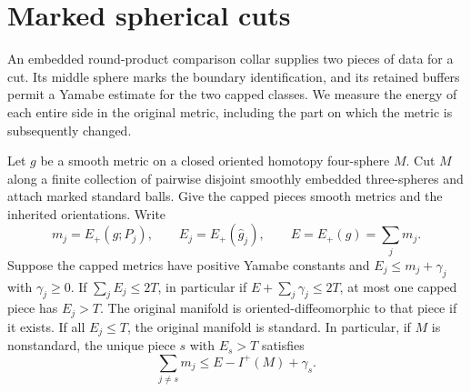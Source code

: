 \section{Marked spherical cuts}\label{sec:cut}

An embedded round-product comparison collar supplies two pieces of data
for a cut. Its middle sphere marks the boundary identification, and its
retained buffers permit a Yamabe estimate for the two capped classes.
We measure the energy of each entire side in the original metric,
including the part on which the metric is subsequently changed.


\begin{proposition}\label{prop:cut-energy}
Let \(g\) be a smooth metric on a closed oriented homotopy four-sphere \(M\). Cut \(M\) along a finite collection of pairwise disjoint smoothly
embedded three-spheres and attach marked standard balls. Give the
capped pieces smooth metrics and the inherited orientations. Write
\[
 m_j=E_+(g;P_j),\qquad E_j=E_+(\widehat g_j),\qquad
 E=E_+(g)=\sum_j m_j .
\]
Suppose the capped metrics have positive Yamabe constants and
\(E_j\leq m_j+\gamma_j\) with \(\gamma_j\geq0\). If
\(\sum_j E_j\leq2T\), in particular if \(E+\sum_j\gamma_j\leq2T\),
at most one capped piece has \(E_j>T\). The original manifold is
oriented-diffeomorphic to that piece if it exists. If all \(E_j\leq T\), the original manifold is
standard. In particular, if \(M\) is nonstandard, the unique piece
\(s\) with \(E_s>T\) satisfies
\begin{equation}\label{eq:cut-discarded}
 \sum_{j\ne s}m_j\leq E-I^+(M)+\gamma_s .
\end{equation}
\end{proposition}


